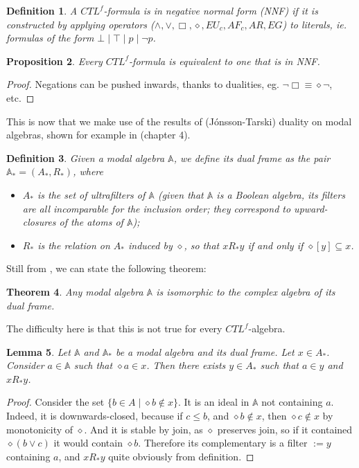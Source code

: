 \documentclass[11pt]{article}
\newcommand{\A}{{\mathbb A}}
\newtheorem{definition}{Definition}[section]
\newtheorem{theorem}[definition]{Theorem}
\newtheorem{proposition}[definition]{Proposition}
\newtheorem{lemma}[definition]{Lemma}
\begin{document}
\begin{definition}\label{NNF}
    A $CTL^f$-formula is in \emph{negative normal form (NNF)} if it is constructed by applying operators ($\wedge,\vee,\Box,\diamond,EU_c,AF_c,AR,EG$) to literals, ie. formulas of the form $\bot\mid\top\mid p\mid \neg p$.
\end{definition} 
\begin{proposition}\label{equiv_NNF}
    Every $CTL^f$-formula is equivalent to one that is in NNF.
\end{proposition}
\begin{proof}
    Negations can be pushed inwards, thanks to dualities, eg. $\neg\Box\equiv\diamond\neg$, etc.
\end{proof}

This is now that we make use of the results of (J\'onsson-Tarski) duality on modal algebras, shown for example in \cite{GehvG22} (chapter 4).
\begin{definition}\label{dual_frame}
    Given a modal algebra $\A$, we define its \emph{dual frame} as the pair $\A_*=(A_*,R_*)$, where
    \begin{itemize}
        \item $A_*$ is the set of \emph{ultrafilters} of $\A$ (given that $\A$ is a Boolean algebra, its filters are all incomparable for the inclusion order; they correspond to upward-closures of the atoms of $\A$);
        \item $R_*$ is the relation on $A_*$ induced by $\diamond$, so that $xR_*y$ if and only if $\diamond [y]\subseteq x$.
    \end{itemize}
\end{definition}
Still from \cite{GehvG22}, we can state the following theorem:
\begin{theorem}\label{dual_modal_algebra}
    Any modal algebra $\A$ is isomorphic to the complex algebra of its dual frame.
\end{theorem}
The difficulty here is that this is not true for every $CTL^f$-algebra.
\begin{lemma}\label{exists_succ_R}
    Let $\A$ and $\A_*$ be a modal algebra and its dual frame. Let $x\in A_*$. Consider $a\in\A$ such that $\diamond a\in x$. Then there exists $y\in A_*$ such that $a\in y$ and $xR_*y$.
\end{lemma}
\begin{proof}
    Consider the set $\{b\in A\mid \diamond b\notin x\}$. It is an ideal in $\A$ not containing $a$. Indeed, it is downwards-closed, because if $c\leq b$, and $\diamond b \notin x$, then $\diamond c \notin x$ by monotonicity of $\diamond$. And it is stable by join, as $\diamond$ preserves join, so if it contained $\diamond(b\vee c)$ it would contain $\diamond b$. Therefore its complementary is a filter $:=y$ containing $a$, and $xR_*y$ quite obviously from definition.
\end{proof}
\end{document}
